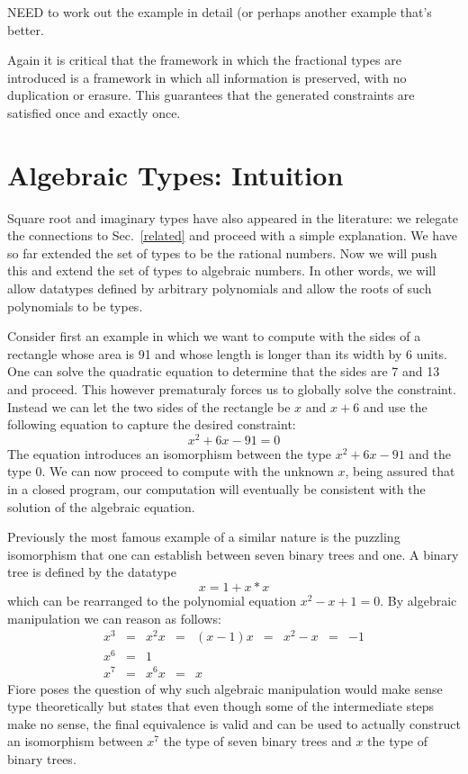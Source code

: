 \documentclass[preprint]{sigplanconf}
\begin{document}
NEED to work out the example in detail (or perhaps another example that's
better. 

Again it is critical that the framework in which the fractional types are
introduced is a framework in which all information is preserved, with no
duplication or erasure. This guarantees that the generated constraints are
satisfied once and exactly once. 

\section{Algebraic Types: Intuition} 

Square root and imaginary types have also appeared in the literature: we
relegate the connections to Sec.~\ref{related} and proceed with a simple
explanation. We have so far extended the set of types to be the rational
numbers. Now we will push this and extend the set of types to algebraic
numbers. In other words, we will allow datatypes defined by arbitrary
polynomials and allow the roots of such polynomials to be types. 

Consider first an example in which we want to compute with the sides of a
rectangle whose area is 91 and whose length is longer than its width by 6
units. One can solve the quadratic equation to determine that the sides are 7
and 13 and proceed. This however prematuraly forces us to globally solve the
constraint. Instead we can let the two sides of the rectangle be $x$ and
$x+6$ and use the following equation to capture the desired constraint:
\[
x^2 + 6x - 91 = 0
\]
The equation introduces an isomorphism between the type $x^2 + 6x - 91$ and
the type $0$. We can now proceed to compute with the unknown $x$, being
assured that in a closed program, our computation will eventually be
consistent with the solution of the algebraic equation. 

Previously the most famous example of a similar nature is the puzzling
isomorphism that one can establish between seven binary trees and one.
A binary tree is defined by the datatype
\[
x = 1 + x * x 
\]
which can be rearranged to the polynomial equation $x^2 - x + 1 = 0$. By
algebraic manipulation we can reason as follows:
\[\begin{array}{rclclclcl}
x^3 &=& x^2 x &=& (x-1) x &=& x^2 - x &=& -1 \\
x^6 &=& 1 \\
x^7 &=& x^6 x &=& x
\end{array}\]
Fiore poses the question of why such algebraic manipulation would make sense
type theoretically but states that even though some of the intermediate steps
make no sense, the final equivalence is valid and can be used to actually
construct an isomorphism between $x^7$ the type of seven binary trees 
and $x$ the type of binary trees.
\end{document}
